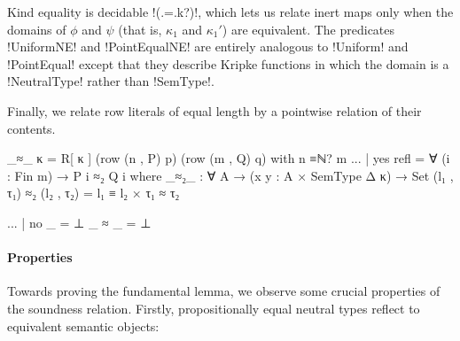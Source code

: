 \begin{AgdaAlign}
\Ni Kind equality is decidable !(.=.k?)!, which lets us relate inert maps only when the domains of $\phi$ and $\psi$ (that is, $\kappa_{1}$ and $\kappa_1'$) are equivalent. The predicates !UniformNE! and !PointEqualNE! are entirely analogous to !Uniform! and !PointEqual! except that they describe Kripke functions in which the domain is a !NeutralType! rather than !SemType!. 

Finally, we relate row literals of equal length by a pointwise relation of their contents.

\begin{code}
  _≈_ {κ = R[ κ ]} (row (n , P) p) (row (m , Q) q) with 
    n ≡ℕ? m 
  ... | yes refl = ∀ (i : Fin m) →  P i ≈₂ Q i
    where
      _≈₂_ : ∀ {A} → (x y : A × SemType Δ κ) → Set
      (l₁ , τ₁) ≈₂ (l₂ , τ₂) = l₁ ≡ l₂ × τ₁ ≈ τ₂    
\end{code}
\begin{code}[hide]
  ... | no _ = ⊥
  _ ≈ _ = ⊥
\end{code}
\end{AgdaAlign}

\paragraph{Properties}

Towards proving the fundamental lemma, we observe some crucial properties of the soundness relation. Firstly, propositionally equal neutral types reflect to equivalent semantic objects:

